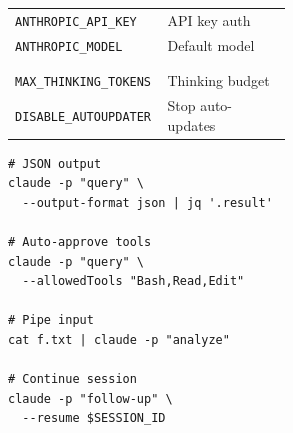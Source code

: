 \documentclass[10pt]{extarticle}
\begin{document}
\begin{multicols}{2}
\begin{tabularx}{\linewidth}{@{}>{\raggedright\arraybackslash}p{0.55\linewidth}@{\enspace}Y@{}}
\texttt{ANTHROPIC\_API\_KEY}        & API key auth \\
\texttt{ANTHROPIC\_MODEL}           & Default model \\
 & \\
 \\
\texttt{MAX\_THINKING\_TOKENS}      & Thinking budget \\
\texttt{DISABLE\_AUTOUPDATER}       & Stop auto-updates \\
\end{tabularx}

{\footnotesize
\begin{verbatim}
# JSON output
claude -p "query" \
  --output-format json | jq '.result'

# Auto-approve tools
claude -p "query" \
  --allowedTools "Bash,Read,Edit"

# Pipe input
cat f.txt | claude -p "analyze"

# Continue session
claude -p "follow-up" \
  --resume $SESSION_ID
\end{verbatim}
}

\end{multicols}
\end{document}
